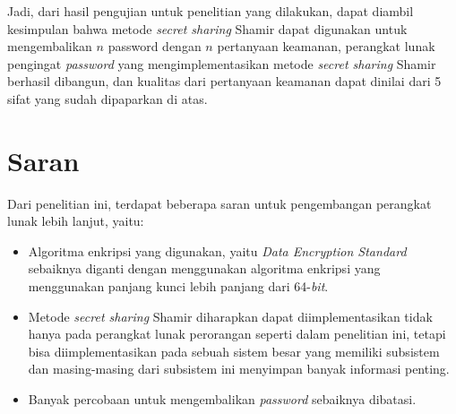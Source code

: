 Jadi, dari hasil pengujian untuk penelitian yang dilakukan, dapat diambil kesimpulan bahwa metode \textit{secret sharing} Shamir dapat digunakan untuk mengembalikan $n$ password dengan $n$ pertanyaan keamanan, perangkat lunak pengingat \textit{password} yang mengimplementasikan metode \textit{secret sharing} Shamir berhasil dibangun, dan kualitas dari pertanyaan keamanan dapat dinilai dari 5 sifat yang sudah dipaparkan di atas.

\section{Saran}

Dari penelitian ini, terdapat beberapa saran untuk pengembangan perangkat lunak lebih lanjut, yaitu:
\begin{itemize}[itemsep=0mm]
	\item Algoritma enkripsi yang digunakan, yaitu \textit{Data Encryption Standard} sebaiknya diganti dengan menggunakan algoritma enkripsi yang menggunakan panjang kunci lebih panjang dari 64-\textit{bit}.
	\item Metode \textit{secret sharing} Shamir diharapkan dapat diimplementasikan tidak hanya pada perangkat lunak perorangan seperti dalam penelitian ini, tetapi bisa diimplementasikan pada sebuah sistem besar yang memiliki subsistem dan masing-masing dari subsistem ini menyimpan banyak informasi penting.
	\item Banyak percobaan untuk mengembalikan \textit{password} sebaiknya dibatasi.
\end{itemize}